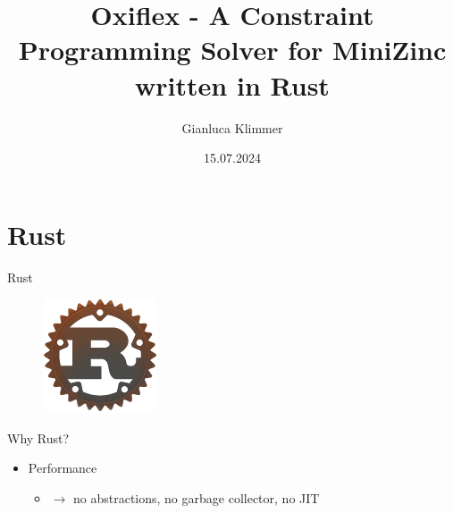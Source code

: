 \documentclass[mathserif,table]{gkibeamer-aaai}
\title[Oxiflex - Constraint Programming Solver for MiniZinc]{Oxiflex - A Constraint Programming Solver for MiniZinc written in Rust}
\author[G.\ Klimmer]{Gianluca Klimmer}
\institute[unibas]{University of Basel}
\date{15.07.2024}
\begin{document}
\section{Rust}

\begin{frame}
\end{frame}

\begin{frame}{Rust}
	\begin{figure}[ht]
		\includegraphics[scale=0.6]{./figures/rust_logo.png}
	\end{figure}
\end{frame}

\begin{frame}{Why Rust?}
	\begin{itemize}
		\item Performance
		      \pause
		      \begin{itemize}
			      \item $\rightarrow$ no abstractions, no garbage collector, no JIT
		      \end{itemize}
	\end{itemize}
\end{frame}
\end{document}
